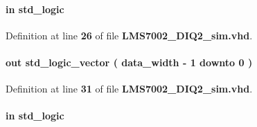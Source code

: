 \paragraph[{ddr\+\_\+en}]{ {\bfseries \textcolor{keywordflow}{in}\textcolor{vhdlchar}{ }} {\bfseries \textcolor{comment}{std\+\_\+logic}\textcolor{vhdlchar}{ }} \hspace{0.3cm}{\ttfamily [Port]}}\label{classLMS7002__DIQ2__sim_adbfe05e6692f69f8e592df06c6055f0a}


Definition at line {\bf 26} of file {\bf L\+M\+S7002\+\_\+\+D\+I\+Q2\+\_\+sim.\+vhd}.

\paragraph[{D\+IQ}]{ {\bfseries \textcolor{keywordflow}{out}\textcolor{vhdlchar}{ }} {\bfseries \textcolor{comment}{std\+\_\+logic\+\_\+vector}\textcolor{vhdlchar}{ }\textcolor{vhdlchar}{(}\textcolor{vhdlchar}{ }\textcolor{vhdlchar}{ }\textcolor{vhdlchar}{ }\textcolor{vhdlchar}{ }{\bfseries {\bf data\+\_\+width}} \textcolor{vhdlchar}{-\/}\textcolor{vhdlchar}{ } \textcolor{vhdldigit}{1} \textcolor{vhdlchar}{ }\textcolor{keywordflow}{downto}\textcolor{vhdlchar}{ }\textcolor{vhdlchar}{ } \textcolor{vhdldigit}{0} \textcolor{vhdlchar}{ }\textcolor{vhdlchar}{)}\textcolor{vhdlchar}{ }} \hspace{0.3cm}{\ttfamily [Port]}}\label{classLMS7002__DIQ2__sim_af8416d8c138850b72d06bc1c88080052}


Definition at line {\bf 31} of file {\bf L\+M\+S7002\+\_\+\+D\+I\+Q2\+\_\+sim.\+vhd}.

\paragraph[{fidm}]{ {\bfseries \textcolor{keywordflow}{in}\textcolor{vhdlchar}{ }} {\bfseries \textcolor{comment}{std\+\_\+logic}\textcolor{vhdlchar}{ }} \hspace{0.3cm}{\ttfamily [Port]}}\label{classLMS7002__DIQ2__sim_a97ae5ad9eee26d5f984f95d151f62ec0}


